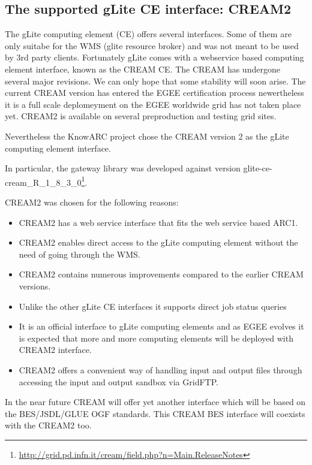 \documentclass{article}
\begin{document}
\subsection{The supported gLite CE interface: CREAM2}
The gLite computing element (CE) offers several interfaces. Some of them are only suitabe for the WMS (glite resource broker) and was not meant to be used by 3rd party clients. Fortunately gLite comes with a webservice based computing element interface, known as the CREAM CE. The CREAM has undergone several major revisions. We can only hope that some stability will soon arise. The current CREAM version has entered the EGEE certification process newertheless it is a full scale deplomeyment on the EGEE worldwide grid has not taken place yet. CREAM2 is available on several preproduction and testing grid sites.\par
Nevertheless the KnowARC project chose the CREAM version 2\cite{cream} as the gLite computing element interface.\par
In particular, the gateway library was developed against version glite-ce-cream\_R\_1\_8\_3\_0\footnote{\url{http://grid.pd.infn.it/cream/field.php?n=Main.ReleaseNotes}}.\par
CREAM2 was chosen for the following reasons:
\begin{itemize}
\item CREAM2 has a web service interface that fits the web service based ARC1.
\item CREAM2 enables direct access to the gLite computing element without the need of going through the WMS.
\item CREAM2 contains numerous improvements compared to the earlier CREAM versions.
\item Unlike the other gLite CE interfaces it supports direct job status queries 
\item It is an official interface to gLite computing elements and as EGEE evolves it is expected that more and more computing elements will be deployed with CREAM2 interface.
\item CREAM2 offers a convenient way of handling input and output files through accessing the input and output sandbox via GridFTP.
\end{itemize}
In the near future CREAM will offer yet another interface which will be based on the BES/JSDL/GLUE OGF standards. This CREAM BES interface will coexists with the CREAM2 too.\par
\end{document}

